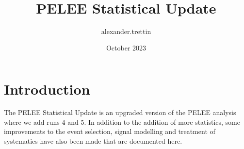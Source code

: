 \documentclass{article}
\title{PELEE Statistical Update}
\author{alexander.trettin }
\date{October 2023}
\begin{document}
\maketitle

\section{Introduction}

The PELEE Statistical Update is an upgraded version of the PELEE analysis where we add runs 4 and 5. In addition to the addition of more statistics, some improvements to the event selection, signal modelling and treatment of systematics have also been made that are documented here. 
\end{document}
